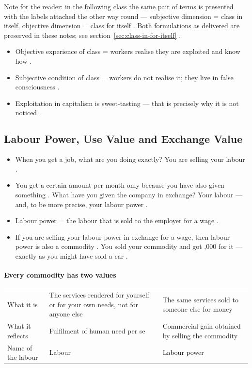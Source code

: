 Note for the reader: in the following class the same pair of terms is presented with the labels attached the other way round --- subjective dimension = class in itself, objective dimension = class for itself . Both formulations as delivered are preserved in these notes; see section~\ref{sec:class-in-for-itself} .

\begin{QuickRevision}
\begin{itemize}
    \item Objective experience of class = workers realise they are exploited and know how .
    \item Subjective condition of class = workers do not realise it; they live in false consciousness .
    \item Exploitation in capitalism is sweet-tasting --- that is precisely why it is not noticed .
\end{itemize}
\end{QuickRevision}

\subsection{Labour Power, Use Value and Exchange Value}
\begin{itemize}
    \item When you get a job, what are you doing exactly? You are selling your labour .
    \item You get a certain amount per month only because you have also given something . What have you given the company in exchange? Your labour --- and, to be more precise, your labour power .
    \item Labour power = the labour that is sold to the employer for a wage .
    \item If you are selling your labour power in exchange for a wage, then labour power is also a commodity . You sold your commodity and got ,000 for it --- exactly as you might have sold a car .
\end{itemize}

\paragraph{Every commodity has two values}
\begin{table}[h!]
\centering
\begin{tabularx}{\textwidth}{lYY}
\toprule
{}
\thead{} &  &  \\
\midrule
What it is & The services rendered for yourself or for your own needs, not for anyone else & The same services sold to someone else for money \\
What it reflects & Fulfilment of human need per se & Commercial gain obtained by selling the commodity \\
Name of the labour & Labour & Labour power \\
\bottomrule
\end{tabularx}
\end{table}

